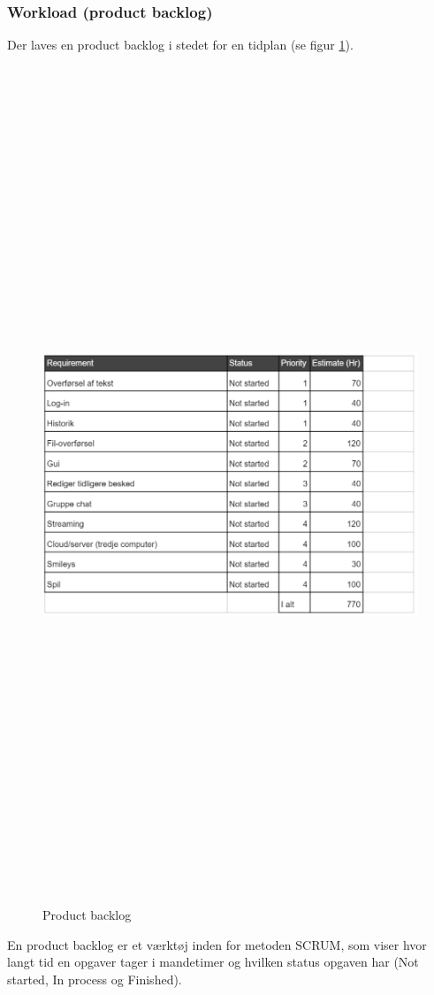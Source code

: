 \subsubsection{Workload (product backlog)}
Der laves en product backlog i stedet for en tidplan (se figur \ref{fig:workload}).
\begin{figure}[ht]
	\centering
	\includegraphics[width=15cm,height=25cm,keepaspectratio]{pictures/Workload.png}
	\caption{Product backlog}
	\label{fig:workload}
	\end{figure}
\newline
En product backlog er et værktøj inden for metoden SCRUM, som viser hvor langt tid en opgaver tager i mandetimer og hvilken status opgaven har (Not started, In process og Finished).
